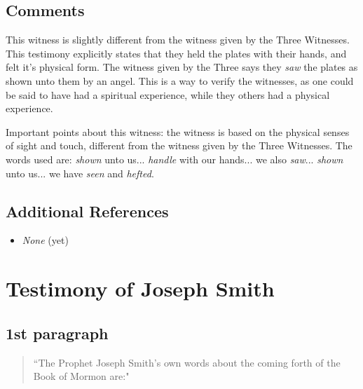 \documentclass[12pt]{report}
\begin{document}
\subsection{Comments\label{8witness:comments}}
This witness is slightly different from the witness given by the Three Witnesses.  This testimony explicitly states that they held the plates with their hands, and felt it's physical form.  The witness given by the Three says they \emph{saw} the plates as shown unto them by an angel.  This is a way to verify the witnesses, as one could be said to have had a spiritual experience, while they others had a physical experience.

Important points about this witness: the witness is based on the physical senses of sight and touch, different from the witness given by the Three Witnesses.  The words used are: \emph{shown} unto us... \emph{handle} with our hands... we also \emph{saw}... \emph{shown} unto us... we have \emph{seen} and \emph{hefted}.

\subsection{Additional References\label{8witness:references}}
\begin{itemize}
\item \emph{None} (yet)
\end{itemize}

\section{Testimony of Joseph Smith\label{JStestimony}}
\subsection{1st paragraph\label{js:1st}}
\begin{center}
\begin{quote}
``The Prophet Joseph Smith's own words about the coming forth of the Book of Mormon are:"
\end{quote}
\end{center}
\end{document}
